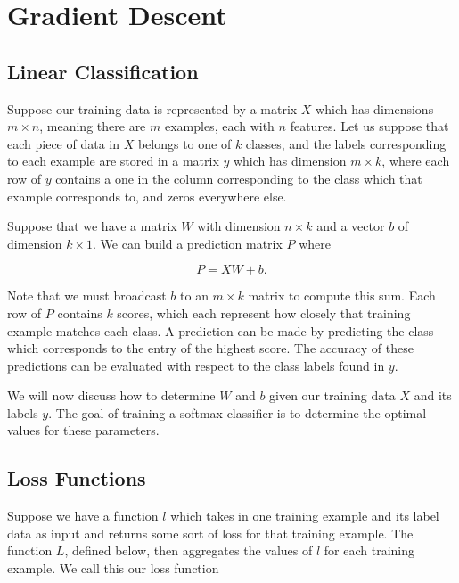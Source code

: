 \newpage
\section{Gradient Descent}\label{ch:gradient_descent} 


\subsection{Linear Classification}

Suppose our training data is represented by a matrix $X$ which has dimensions
$m \times n$, meaning there are $m$ examples, each with $n$ features. Let us
suppose that each piece of data in $X$ belongs to one of $k$ classes, and the
labels corresponding to each example are stored in a matrix $y$ which has
dimension $m \times k$, where each row of $y$ contains a one in the column
corresponding to the class which that example corresponds to, and zeros
everywhere else.

Suppose that we have a matrix $W$ with dimension $n \times k$ and a vector $b$
of dimension $k \times 1$. We can build a prediction matrix $P$ where

\[
P = XW + b.
\]

Note that we must broadcast $b$ to an $m \times k$ matrix to compute this sum.
Each row of $P$ contains $k$ scores, which each represent how closely that
training example matches each class. A prediction can be made by predicting the
class which corresponds to the entry of the highest score. The accuracy of
these predictions can be evaluated with respect to the class labels found in
$y$.

We will now discuss how to determine $W$ and $b$ given our training data $X$
and its labels $y$. The goal of training a softmax classifier is to determine
the optimal values for these parameters.

\subsection{Loss Functions}

Suppose we have a function $l$ which takes in one training example and its
label data as input and returns some sort of loss for that training example.
The function $L$, defined below, then aggregates the values of $l$ for each
training example. We call this our loss function

